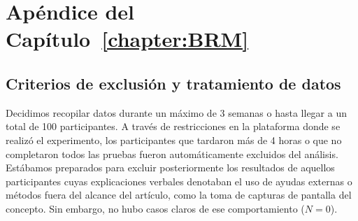 
\chapter{Apéndice del Capítulo~\ref{chapter:BRM}}

\section{Criterios de exclusión y tratamiento de datos}\label{Sec:ExclusionCriteria}

Decidimos recopilar datos durante un máximo de 3 semanas o hasta llegar a un total de 100 participantes. A través de restricciones en la plataforma donde se realizó el experimento, los participantes que tardaron más de 4 horas o que no completaron todos las pruebas fueron automáticamente excluidos del análisis. Estábamos preparados para excluir posteriormente los resultados de aquellos participantes cuyas explicaciones verbales denotaban el uso de ayudas externas o métodos fuera del alcance del artículo, como la toma de capturas de pantalla del concepto. Sin embargo, no hubo casos claros de ese comportamiento ($ N = 0 $).

